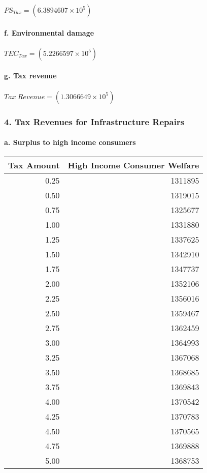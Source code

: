 \documentclass[]{article}
\let\oldparagraph\paragraph
\renewcommand{\paragraph}[1]{\oldparagraph{#1}\mbox{}}
\begin{document}
\(PS_{Tax} = (6.3894607\times 10^{5})\)

\paragraph{f. Environmental damage}\label{f.-environmental-damage}

\(TEC_{Tax} = (5.2266597\times 10^{5})\)

\paragraph{g. Tax revenue}\label{g.-tax-revenue}

\(Tax~Revenue = (1.3066649\times 10^{5})\)

\subsubsection{4. Tax Revenues for Infrastructure
Repairs}\label{tax-revenues-for-infrastructure-repairs}

\paragraph{a. Surplus to high income
consumers}\label{a.-surplus-to-high-income-consumers}

\begin{table}[H]
\centering
\begin{tabular}{r|r}
\hline
Tax Amount & High Income Consumer Welfare\\
\hline
0.25 & 1311895\\
\hline
0.50 & 1319015\\
\hline
0.75 & 1325677\\
\hline
1.00 & 1331880\\
\hline
1.25 & 1337625\\
\hline
1.50 & 1342910\\
\hline
1.75 & 1347737\\
\hline
2.00 & 1352106\\
\hline
2.25 & 1356016\\
\hline
2.50 & 1359467\\
\hline
2.75 & 1362459\\
\hline
3.00 & 1364993\\
\hline
3.25 & 1367068\\
\hline
3.50 & 1368685\\
\hline
3.75 & 1369843\\
\hline
4.00 & 1370542\\
\hline
4.25 & 1370783\\
\hline
4.50 & 1370565\\
\hline
4.75 & 1369888\\
\hline
5.00 & 1368753\\
\hline
\end{tabular}
\end{table}
\end{document}
